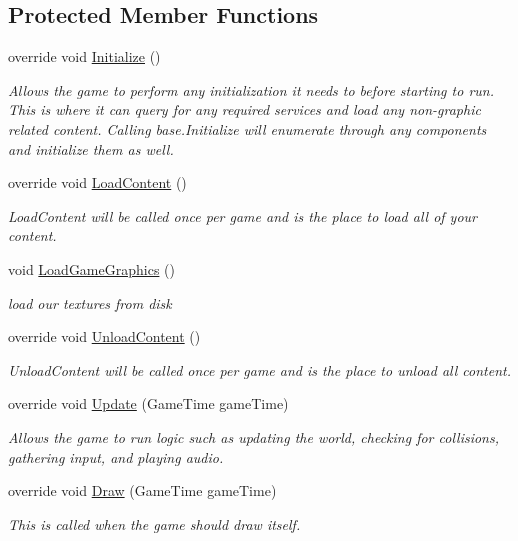 \subsection*{Protected Member Functions}
\begin{DoxyCompactItemize}
\item 
override void \hyperlink{class_ping___pong_1_1_game1_ae8a0320b8583f5f671dcf98a5ca232df}{Initialize} ()
\begin{DoxyCompactList}\small\item\em Allows the game to perform any initialization it needs to before starting to run. This is where it can query for any required services and load any non-\/graphic related content. Calling base.\+Initialize will enumerate through any components and initialize them as well. \end{DoxyCompactList}\item 
override void \hyperlink{class_ping___pong_1_1_game1_a6d3747853eb20dd83968478792b1a19d}{Load\+Content} ()
\begin{DoxyCompactList}\small\item\em Load\+Content will be called once per game and is the place to load all of your content. \end{DoxyCompactList}\item 
void \hyperlink{class_ping___pong_1_1_game1_ac022f03857d45e8396e520c70eceb9c5}{Load\+Game\+Graphics} ()
\begin{DoxyCompactList}\small\item\em load our textures from disk \end{DoxyCompactList}\item 
override void \hyperlink{class_ping___pong_1_1_game1_a558bcf5c17e9f410d5cceb2f66e2dd67}{Unload\+Content} ()
\begin{DoxyCompactList}\small\item\em Unload\+Content will be called once per game and is the place to unload all content. \end{DoxyCompactList}\item 
override void \hyperlink{class_ping___pong_1_1_game1_adcf5d3a66fa192e3318b14188dd0c34a}{Update} (Game\+Time game\+Time)
\begin{DoxyCompactList}\small\item\em Allows the game to run logic such as updating the world, checking for collisions, gathering input, and playing audio. \end{DoxyCompactList}\item 
override void \hyperlink{class_ping___pong_1_1_game1_a4ce721b84f4194ecc1a8bf27b27f0955}{Draw} (Game\+Time game\+Time)
\begin{DoxyCompactList}\small\item\em This is called when the game should draw itself. \end{DoxyCompactList}\end{DoxyCompactItemize}


